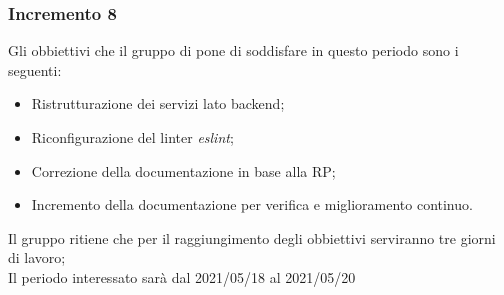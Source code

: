
\subsubsection{Incremento 8}
Gli obbiettivi che il gruppo di pone di soddisfare in questo periodo sono i seguenti:
\begin{itemize}
    \item Ristrutturazione dei servizi lato backend;
    \item Riconfigurazione del linter \textit{eslint};
    \item Correzione della documentazione in base alla RP;
    \item Incremento della documentazione per verifica e miglioramento continuo.
\end{itemize}
Il gruppo ritiene che per il raggiungimento degli obbiettivi serviranno tre giorni di lavoro;\\
Il periodo interessato sarà dal 2021/05/18 al 2021/05/20

